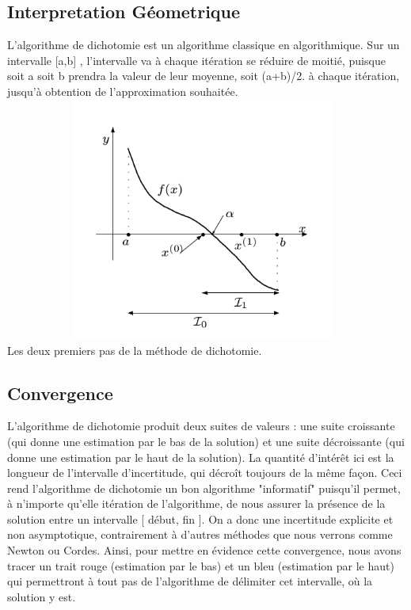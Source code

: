 \documentclass{article}
\begin{document}
\subsection{Interpretation Géometrique}
L'algorithme de dichotomie est un algorithme classique en algorithmique. Sur un intervalle [a,b] , l'intervalle va à chaque itération se réduire de moitié, puisque soit a soit b prendra la valeur de leur moyenne, soit (a+b)/2. à chaque itération, jusqu'à obtention de l'approximation souhaitée.
\\
\includegraphics[width=13cm,height=8cm]{img/interpretation/dichotomie.png}\\
Les deux premiers pas de la méthode de dichotomie.


\subsection{Convergence}
L'algorithme de dichotomie produit deux suites de valeurs : une suite croissante (qui donne une estimation par le bas de la solution) et une suite décroissante (qui donne une estimation par le haut de la solution). La quantité d’intérêt ici est la longueur de l'intervalle d'incertitude, qui décroît toujours de la même façon.
Ceci rend l'algorithme de dichotomie un bon algorithme "informatif" puisqu'il permet, à n'importe qu'elle itération de l'algorithme, de nous assurer la présence de la solution entre un intervalle [ début, fin ]. On a donc une incertitude explicite et non asymptotique, contrairement à d'autres méthodes que nous verrons comme Newton ou Cordes. 
Ainsi, pour mettre en évidence cette convergence, nous avons tracer un trait rouge (estimation par le bas) et un bleu (estimation par le haut) qui permettront à tout pas de l'algorithme de délimiter cet intervalle, où la solution y est.
\end{document}
